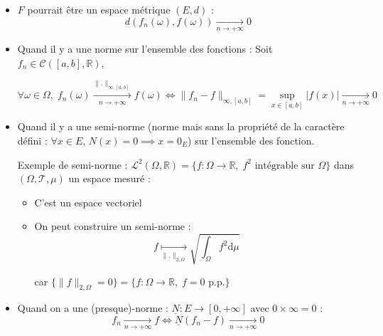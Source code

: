 \begin{itemize}

    \item $F$ pourrait être un espace métrique $(E,d)$ : 
      \begin{equation}
        d(f_n(\omega), f(\omega))  \underset{n \to +\infty}{\longrightarrow} 0
      \end{equation}

    \item Quand il y a une norme sur l'ensemble des fonctions : Soit $f_n \in \mathscr{C}([a,b], \mathbb{R})$,

  \begin{equation}
    \forall \omega \in \Omega, \; f_n(\omega)  \overset{\| . \|_ {\infty, [a,b]}}{\underset{n \to +\infty}{\longrightarrow}} f(\omega) \iff \| f_n - f \| _{ \infty, [a,b]}  = \underset{x \in [a,b]}{\sup} |f(x)|\underset{n \to +\infty}{\longrightarrow} 0
  \end{equation}

   \item Quand il y a une semi-norme (norme mais sans la propriété de la caractère défini : $\forall x \in E$, $N(x) =0 \implies x = 0_E$) sur l'ensemble des fonction. 

     \begin{tcolorbox}
       Exemple de semi-norme : $\mathcal{L} ^{2}(\Omega, \mathbb{R}) = \{f : \Omega \to \mathbb{R}, \; f ^{2} \text{ intégrable sur } \Omega\}$ dans $(\Omega, \mathscr{T}, \mu)$ un espace mesuré : 
         \begin{itemize}

             \item C'est un espace vectoriel
              \item On peut construire un semi-norme : 
                \begin{equation}
                  f \underset{\| . \|_{2, \Omega}}{\mapsto} \sqrt{\int_{
                      \Omega
                  }^{} f ^{2} \mathrm{d}\mu}
                \end{equation}

                car $\{ \| f \| _{2,\Omega} = 0\} = \{f : \Omega \to \mathbb{R}, \; f = 0 \text{ p.p.}\}$

         \end{itemize}
     \end{tcolorbox}

   \item Quand on a une (presque)-norme : $\underline{N} :E \to [0, +\infty]$ avec $0 \times \infty = 0$ : 
     \begin{equation}
       f_n  \underset{n \to +\infty}{\longrightarrow}  f \iff \underline{N}(f_n-f)  \underset{n \to + \infty}{\longrightarrow} 0
     \end{equation}


\end{itemize}
